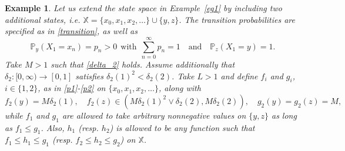 \documentclass[11pt,reqno]{article}
\numberwithin{equation}{section}
\newtheorem{example}{Example}[section]
\renewcommand{\P}{\mathbb{P}}
\newcommand{\X}{\mathbb{X}}
\begin{document}
\begin{example}\label{eg2}
Let us extend the state space in Example~\ref{eg1} by including two additional states, i.e. $\mathbb{X}=\{x_0,x_1,x_2,\dotso\}\cup\{y,z\}$. The transition probabilities are specified as in \eqref{transition}, as well as 
\begin{equation}\label{transition'}
\P_y(X_1=x_n)=p_n>0\ \ \text{with}\ \ \sum_{n=0}^\infty p_n=1\quad\text{and}\quad\P_z(X_1=y)=1.
\end{equation}
Take $M>1$ such that \eqref{delta_2} holds. Assume additionally that $\delta_2:[0,\infty)\to[0,1]$ satisfies 
$\delta_2(1)^2<\delta_2(2)$. 
Take $L>1$ and define $f_i$ and $g_i$, $i\in\{1,2\}$, as in \eqref{p1}-\eqref{p2} on $\{x_0,x_1,x_2,\dotso\}$, along with
\begin{equation}\label{p2'}
f_2(y)=M\delta_2(1),\quad f_2(z) \in \left(M\delta_2(1)^2\vee \delta_2(2), M\delta_2(2)\right),
\quad g_2(y)=g_2(z)=M,
\end{equation}
while $f_1$ and $g_1$ are allowed to take arbitrary nonnegative values on $\{y,z\}$ as long as $f_1\le g_1$. Also, $h_1$ (resp. $h_2$) is allowed to be any function such that $f_1\le h_1\le g_1$ (resp. $f_2\le h_2\le g_2$) on $\X$.



\end{example}
\end{document}
